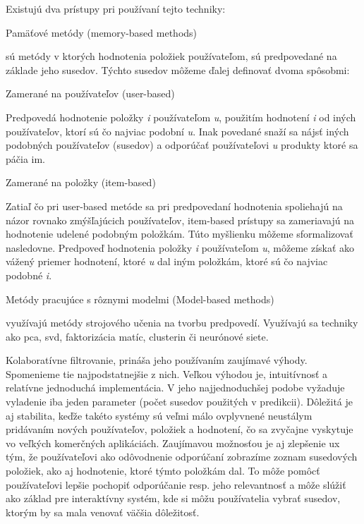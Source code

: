 Existujú dva prístupy pri používaní tejto techniky:
\begin{enumerate}
	{\bf \item Pamäťové metódy (memory-based methods)} sú metódy v ktorých hodnotenia položiek používateľom, sú predpovedané na základe jeho susedov. Týchto susedov môžeme ďalej definovať dvoma spôsobmi: \cite{rs3}
\begin{itemize}[leftmargin=*]
	{\bf \item Zamerané na používateľov (user-based)}\newline	
Predpovedá hodnotenie položky \textit{i} používateľom \textit{u}, použitím hodnotení \textit{i} od iných používateľov, ktorí sú čo najviac podobní \textit{u}. Inak povedané snaží sa nájsť iných podobných používateľov (susedov) a odporúčať používateľovi \textit{u} produkty ktoré sa páčia im.
	{\bf \item Zamerané na položky (item-based)} \newline
Zatiaľ čo pri user-based metóde sa pri predpovedaní hodnotenia spoliehajú na názor rovnako zmýšľajúcich používateľov, item-based prístupy sa zameriavajú na hodnotenie udelené podobným položkám. Túto myšlienku môžeme sformalizovať nasledovne. Predpoveď hodnotenia položky \textit{i} používateľom \textit{u}, môžeme získať ako vážený priemer hodnotení, ktoré \textit{u} dal iným položkám, ktoré sú čo najviac podobné \textit{i}. \cite{rs1}
\end{itemize}
	{\bf \item Metódy pracujúce s rôznymi modelmi (Model-based methods)} využívajú metódy strojového učenia na tvorbu predpovedí. Využívajú sa techniky ako \acrshort{pca}, \acrshort{svd}, faktorizácia matíc, clusterin či neurónové siete. \cite{rs3} \\
\end{enumerate}

Kolaboratívne filtrovanie, prináša jeho používaním zaujímavé výhody. Spomenieme tie najpodstatnejšie z nich. Veľkou výhodou je, intuitívnosť a relatívne jednoduchá implementácia. V jeho najjednoduchšej podobe vyžaduje vyladenie iba jeden parameter (počet susedov použitých v predikcii). Dôležitá je aj stabilita, keďže takéto systémy sú veľmi málo ovplyvnené neustálym pridávaním nových používateľov, položiek a hodnotení, čo sa zvyčajne vyskytuje vo veľkých komerčných aplikáciách.
Zaujímavou možnosťou je aj zlepšenie \acrshort{ux} tým, že používateľovi ako odôvodnenie odporúčaní zobrazíme zoznam susedových položiek, ako aj hodnotenie, ktoré týmto položkám dal. To môže pomôcť používateľovi lepšie pochopiť odporúčanie resp. jeho relevantnosť a môže slúžiť ako základ pre interaktívny systém, kde si môžu používatelia vybrať susedov, ktorým by sa mala venovať väčšia dôležitosť. \cite{rs1} \\



